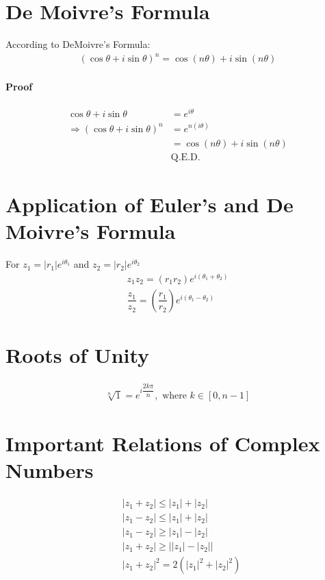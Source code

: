 \documentclass[../main.tex]{subfiles}
\begin{document}
	\section{De Moivre's Formula}
	According to DeMoivre's Formula:
	\begin{align}
		(\cos\theta+i\sin\theta)^n=\cos (n\theta)+i\sin(n\theta)
	\end{align}
	\paragraph{Proof}
	\begin{align*}
		\cos \theta + i \sin \theta & = e^{i\theta}\\
		\Rightarrow \left(\cos \theta + i \sin \theta \right)^n & = e^{n \left( i \theta \right)}\\
		& = \cos (n\theta)+i\sin(n\theta)\\
		& \text{Q.E.D.}
	\end{align*}
	
	\section{Application of Euler's and De Moivre's Formula}
	For $z_1= \left| r_1 \right| e^{i\theta_1}$ and $z_2= \left| r_2 \right| e^{i\theta_2}$
	\begin{align}
		z_1z_2= \left( r_1 r_2 \right)e^{i(\theta_1+\theta_2)}\\
		\dfrac{z_1}{z_2}=\left( \dfrac{r_1}{r_2} \right) e^{i(\theta_1-\theta_2)}
	\end{align}
	
	\section{Roots of Unity}
	\begin{align}
		\sqrt[n]{1}=e^{i\dfrac{2k\pi}{n}},\text{ where } k \in [0,n-1]
	\end{align}
	
	\section{Important Relations of Complex Numbers}
	\begin{align}
		& \left| z_1 + z_2 \right| \leq \left| z_1 \right| + \left| z_2 \right|\\
		& \left| z_1 - z_2 \right| \leq \left| z_1 \right| + \left| z_2 \right|\\
		& \left| z_1 - z_2 \right| \geq \left| z_1 \right| - \left| z_2 \right|\\
		& \left| z_1 + z_2 \right| \geq \left| \left| z_1 \right| - \left| z_2 \right| \right|\\
		& \left| z_1 + z_2 \right|^2 = 2 \left( \left| z_1 \right|^2 + \left| z_2 \right|^2 \right)
	\end{align}
\end{document}
